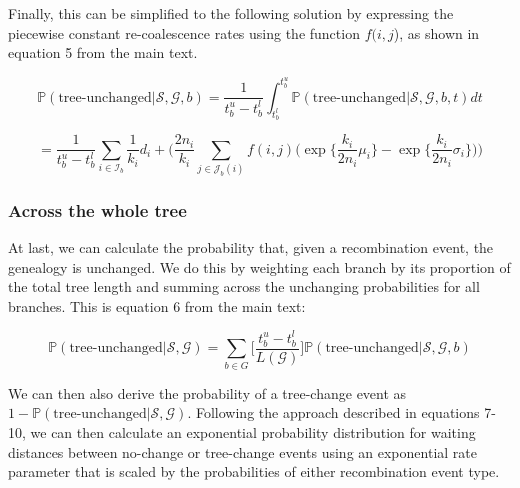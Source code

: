 \documentclass[11pt]{article}
\begin{document}
\noindent Finally, this can be simplified to the following solution by expressing
the piecewise constant re-coalescence rates using the function $f(i,j$), as shown
in equation 5 from the main text.

\begin{equation*}
	\mathbb{P}(\textrm{tree-unchanged} | \mathcal{S},\mathcal{G},b) = 
	\frac{1}{t^u_b-t^l_b} \int_{t_b^l}^{t_b^u} 
	\mathbb{P}(\textrm{tree-unchanged} | \mathcal{S},\mathcal{G},b,t)dt
\end{equation*}

\begin{equation}\tag{5}
	= \frac{1}{t_b^u - t_b^l}
	\sum_{i \in \mathcal{I}_b} 
	\frac{1}{k_i} d_i + 
	\Bigg(
		\frac{2n_i}{k_i} 
		\sum_{j \in \mathcal{J}_b(i)} f(i,j)
		\bigg(
			\exp\bigg\{ \frac{k_i}{2n_i} \mu_i \bigg\} - 
			\exp\bigg\{ \frac{k_i}{2n_i} \sigma_i \bigg\}
		\bigg)
	\Bigg)
\end{equation}


\subsubsection{Across the whole tree}

At last, we can calculate the probability that, given a recombination event, 
the genealogy is unchanged. We do this by weighting each branch by its proportion 
of the total tree length and summing across the unchanging probabilities for 
all branches. This is equation 6 from the main text:

\begin{equation}\tag{6}
	\mathbb{P}(\textrm{tree-unchanged} | \mathcal{S}, \mathcal{G}) = 
	\sum_{b \in G}
	\bigg[
		\frac{t_b^u - t_b^l}{L(\mathcal{G})}
	\bigg]
	\mathbb{P}(\text{tree-unchanged} | \mathcal{S}, \mathcal{G}, b)
\end{equation}

\noindent We can then also derive the probability of a tree-change event
as $1-\mathbb{P}(\textrm{tree-unchanged} | \mathcal{S}, \mathcal{G})$.
Following the approach described in equations 7-10, we can then calculate 
an exponential probability distribution for waiting distances between 
no-change or tree-change events using an exponential rate parameter that is
scaled by the probabilities of either recombination event type.
\end{document}
